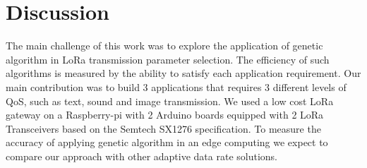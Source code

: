 \section{Discussion} \label{sec:Conclusion}

The main challenge of this work was to explore the application of genetic algorithm in LoRa transmission parameter selection.
The efficiency of such algorithms is measured by the ability to satisfy each application requirement.
Our main contribution was to build 3 applications that requires 3 different levels of QoS,
	such as text,
	sound and image transmission.
We used a low cost LoRa gateway on a Raspberry-pi with 2 Arduino boards equipped with 2 LoRa Transceivers based on the Semtech SX1276 specification.
To measure the accuracy of applying genetic algorithm in an edge computing we expect to compare our approach with other adaptive data rate solutions.







